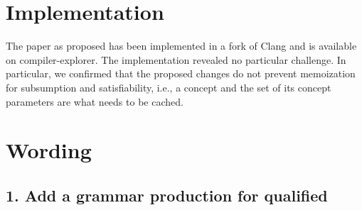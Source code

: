 \documentclass{wg21}
\begin{document}
%
%
%
%

\section{Implementation}


The paper as proposed has been implemented in a fork of Clang and is available on compiler-explorer.
The implementation revealed no particular challenge. In particular, we confirmed that the proposed changes
do not prevent memoization for subsumption and satisfiability, i.e., a concept and the set of its concept parameters
are what needs to be cached.

\section{Wording}

\subsection{\textcolor{noteclr}{1. Add a grammar production for qualified }}
\end{document}
